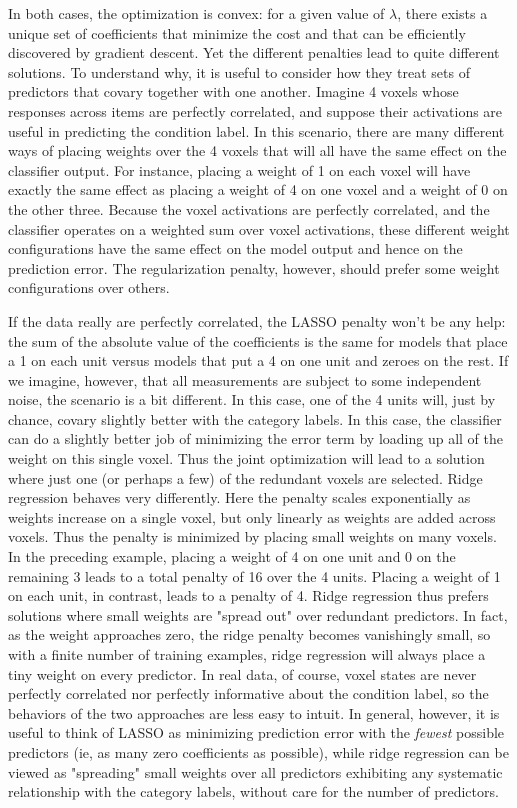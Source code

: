 In both cases, the optimization is convex: for a given value of $\lambda$, there exists a unique set of coefficients that minimize the cost and that can be efficiently discovered by gradient descent. Yet the different penalties lead to quite different solutions. To understand why, it is useful to consider how they treat sets of predictors that covary together with one another. Imagine 4 voxels whose responses across items are perfectly correlated, and suppose their activations are useful in predicting the condition label. In this scenario, there are many different ways of placing weights over the 4 voxels that will all have the same effect on the classifier output. For instance, placing a weight of 1 on each voxel will have exactly the same effect as placing a weight of 4 on one voxel and a weight of 0 on the other three. Because the voxel activations are perfectly correlated, and the classifier operates on a weighted sum over voxel activations, these different weight configurations have the same effect on the model output and hence on the prediction error. The regularization penalty, however, should prefer some weight configurations over others.

If the data really are perfectly correlated, the LASSO penalty won't be any help: the sum of the absolute value of the coefficients is the same for models that place a 1 on each unit versus models that put a 4 on one unit and zeroes on the rest. If we imagine, however, that all measurements are subject to some independent noise, the scenario is a bit different. In this case, one of the 4 units will, just by chance, covary slightly better with the category labels. In this case, the classifier can do a slightly better job of minimizing the error term by loading up all of the weight on this single voxel. Thus the joint optimization will lead to a solution where just one (or perhaps a few) of the redundant voxels are selected. Ridge regression behaves very differently. Here the penalty scales exponentially as weights increase on a single voxel, but only linearly as weights are added across voxels. Thus the penalty is minimized by placing small weights on many voxels. In the preceding example, placing a weight of 4 on one unit and 0 on the remaining 3 leads to a total penalty of 16 over the 4 units. Placing a weight of 1 on each unit, in contrast, leads to a penalty of 4. Ridge regression thus prefers solutions where small weights are "spread out" over redundant predictors. In fact, as the weight approaches zero, the ridge penalty becomes vanishingly small, so with a finite number of training examples, ridge regression will always place a tiny weight on every predictor. In real data, of course, voxel states are never perfectly correlated nor perfectly informative about the condition label, so the behaviors of the two approaches are less easy to intuit. In general, however, it is useful to think of LASSO as minimizing prediction error with the {\em fewest} possible predictors (ie, as many zero coefficients as possible), while ridge regression can be viewed as "spreading" small weights over all predictors exhibiting any systematic relationship with the category labels, without care for the number of predictors. 

